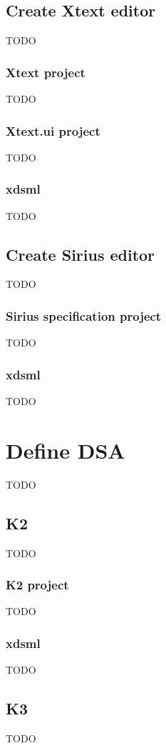 \documentclass{gemoc} %
\begin{document}
\subsection{Create Xtext editor}
TODO


\subsubsection{Xtext project}
TODO
\subsubsection{Xtext.ui project}
TODO
\subsubsection{xdsml}
TODO
\subsection{Create Sirius editor}
TODO


\subsubsection{Sirius specification project}
TODO
\subsubsection{xdsml}
TODO
\section{Define DSA}
\label{sec:Define_DSA}

TODO

\subsection{K2}
TODO


\subsubsection{K2 project}
TODO
\subsubsection{xdsml}
TODO
\subsection{K3}
TODO
\end{document}
